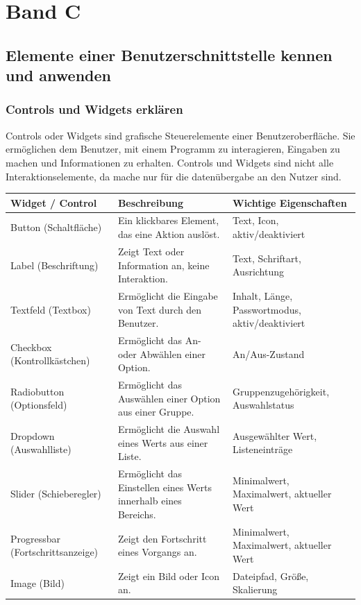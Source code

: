 \documentclass[10pt]{article}
\newcounter{subsubsubsection}[subsubsection]
\begin{document}
	\section{Band C}
	\subsection{Elemente einer Benutzerschnittstelle kennen und anwenden}
	\subsubsection{Controls und Widgets erklären}
	Controls oder Widgets sind grafische Steuerelemente einer Benutzeroberfläche. Sie ermöglichen dem Benutzer, mit einem Programm zu interagieren, Eingaben zu machen und Informationen zu erhalten. Controls und Widgets sind nicht alle Interaktionselemente, da mache nur für die datenübergabe an den Nutzer sind.
	
	\begin{tabular}{@{}lll@{}}
		\toprule
		\textbf{Widget / Control} & \textbf{Beschreibung} & \textbf{Wichtige Eigenschaften} \\
		\midrule
		Button (Schaltfläche) & Ein klickbares Element, das eine Aktion auslöst. & Text, Icon, aktiv/deaktiviert \\
		Label (Beschriftung) & Zeigt Text oder Information an, keine Interaktion. & Text, Schriftart, Ausrichtung \\
		Textfeld (Textbox) & Ermöglicht die Eingabe von Text durch den Benutzer. & Inhalt, Länge, Passwortmodus, aktiv/deaktiviert \\
		Checkbox (Kontrollkästchen) & Ermöglicht das An- oder Abwählen einer Option. & An/Aus-Zustand \\
		Radiobutton (Optionsfeld) & Ermöglicht das Auswählen einer Option aus einer Gruppe. & Gruppenzugehörigkeit, Auswahlstatus \\
		Dropdown (Auswahlliste) & Ermöglicht die Auswahl eines Werts aus einer Liste. & Ausgewählter Wert, Listeneinträge \\
		Slider (Schieberegler) & Ermöglicht das Einstellen eines Werts innerhalb eines Bereichs. & Minimalwert, Maximalwert, aktueller Wert \\
		Progressbar (Fortschrittsanzeige) & Zeigt den Fortschritt eines Vorgangs an. & Minimalwert, Maximalwert, aktueller Wert \\
		Image (Bild) & Zeigt ein Bild oder Icon an. & Dateipfad, Größe, Skalierung \\
		\bottomrule
	\end{tabular}
	
\end{document}
